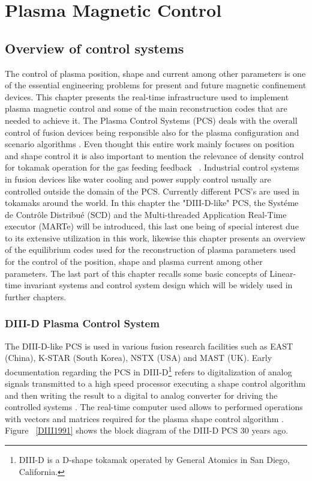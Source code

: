 \chapter{Plasma Magnetic Control}
\label{Chap2}
\section{Overview of control systems}
The control of  plasma position, shape and current among other parameters is one of the essential engineering problems for present and future magnetic confinement devices. This chapter presents the real-time infrastructure used to implement plasma magnetic control and  some of the main reconstruction codes that are needed to achieve it. The Plasma Control Systems (PCS) deals with the overall control of  fusion devices being responsible also for the  plasma configuration and scenario algorithms \cite[Chapter~8]{PCS_2018}. Even thought this entire work mainly focuses on position and shape control it is also important to mention the relevance of density control for tokamak operation for the gas feeding feedback ~\cite{densityControl}. Industrial control systems in fusion devices like water cooling and power supply control usually are controlled outside the domain of the PCS. Currently different PCS's are used in  tokamaks around the world. In this chapter the "DIII-D-like" PCS, the Syst\'eme de Contr\^ole Distribu\'e (SCD) and the Multi-threaded Application Real-Time executor (MARTe) will be introduced, this last one being of special interest due to its extensive utilization in this work, likewise this chapter presents an overview of the equilibrium codes  used for the reconstruction of plasma parameters used for the control of the  position, shape and plasma current among other parameters. The last part of this chapter recalls some basic concepts of Linear-time invariant systems and control system design which will be widely used in further chapters.


\subsection{DIII-D Plasma Control System}  

The DIII-D-like PCS is used in various fusion research facilities such as EAST (China), K-STAR (South Korea), NSTX (USA) and MAST (UK). Early documentation regarding the PCS in DIII-D\footnote{DIII-D is a D-shape tokamak operated by General Atomics in San Diego, California. } refers to digitalization of analog signals transmitted to a high speed processor executing a shape control algorithm and then writing the result to a digital to analog converter for driving the controlled systems . The real-time computer used allows to performed operations with vectors and matrices required for the plasma shape control algorithm \cite{DIIDcontrol}. Figure ~\ref{DIII1991} shows the block diagram of the DIII-D PCS 30 years ago.
\smallskip

